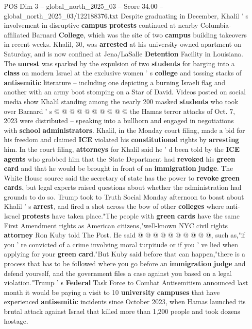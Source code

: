 \begin{textsample}{POS Dim 3 – global\_north\_2025\_03 – Score 34.00 – global\_north\_2025\_03/122188376.txt}
Despite graduating in December, Khalil ' s involvement in disruptive \textbf{campus} \textbf{protests} continued at nearby Columbia-affiliated Barnard \textbf{College}, which was the site of two \textbf{campus} building takeovers in recent weeks.
Khalil, 30, was \textbf{arrested} at his university-owned apartment on Saturday, and is now confined at Jena/LaSalle \textbf{Detention} Facility in Louisiana.
The \textbf{unrest} was sparked by the expulsion of two \textbf{students} for barging into a \textbf{class} on modern Israel at the exclusive women ' s \textbf{college} and tossing stacks of \textbf{antisemitic} literature -- including one depicting a burning Israeli flag and another with an army boot stomping on a Star of David.
Videos posted on social media show Khalil standing among the nearly 200 masked \textbf{students} who took over Barnard ' s @ @ @ @ @ @ @ @ @ @ the Hamas terror attacks of Oct. 7, 2023 were distributed -- speaking into a bullhorn and engaged in negotiations with \textbf{school} \textbf{administrators}.
Khalil, in the Monday court filing, made a bid for his freedom and claimed \textbf{ICE} violated his \textbf{constitutional} rights by \textbf{arresting} him.
In the court filing, \textbf{attorneys} for Khalil said he ' d been told by the \textbf{ICE} \textbf{agents} who grabbed him that the State Department had \textbf{revoked} his \textbf{green} \textbf{card} and that he would be brought in front of an \textbf{immigration} \textbf{judge}.
The White House source said the secretary of state has the power to \textbf{revoke} \textbf{green} \textbf{cards}, but legal experts raised questions about whether the administration had grounds to do so.
Trump took to Truth Social Monday afternoon to boast about Khalil ' s \textbf{arrest}, and fired a shot across the bow of other \textbf{colleges} where anti-Israel \textbf{protests} have taken place."The people with \textbf{green} \textbf{cards} have the same First Amendment rights as American citizens,"well-known NYC civil rights \textbf{attorney} Ron Kuby told The Post.
He said @ @ @ @ @ @ @ @ @ @, such as,"if you ' re convicted of a crime involving moral turpitude or if you ' ve lied when applying for your \textbf{green} \textbf{card}."But Kuby said before that can happen,"there is a process that has to be followed where you go before an \textbf{immigration} \textbf{judge} and defend yourself, and the government files a case against you based on a legal violation."Trump ' s \textbf{Federal} Task Force to Combat Antisemitism announced last month it would be paying a visit to 10 \textbf{university} \textbf{campuses} that have experienced \textbf{antisemitic} incidents since October 2023, when Hamas launched its brutal attack against Israel that killed more than 1,200 people and took dozens hostage.

\end{textsample}
